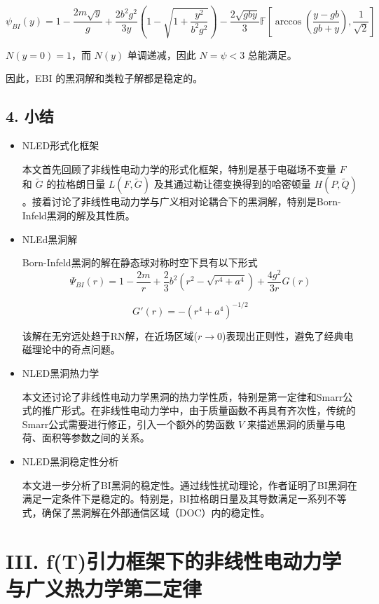 \documentclass[aps,prl,preprint,groupedaddress]{revtex4-2}
\begin{document}
$$
\psi_{BI}(y)
=1-\frac{2m\sqrt{y} }{g } + \frac{2b^2 g^2 }{3y } \left(1-\sqrt{1+\frac{y^2 }{b^2 g^2 } } \right) - \frac{2\sqrt{gby} }{3 } \mathbb{F}\left[\arccos\left(\frac{y-gb }{gb+y } \right), \frac{1 }{\sqrt{2} } \right]
$$

$N(y=0)=1$，而 $N(y)$ 单调递减，因此 $N=\psi<3$ 总能满足。

因此，EBI 的黑洞解和类粒子解都是稳定的。

\subsection{4. 小结}

\begin{itemize}
    \item NLED形式化框架

本文首先回顾了非线性电动力学的形式化框架，特别是基于电磁场不变量 $F$ 和 $\tilde{G}$ 的拉格朗日量 $L(F,\tilde{G})$ 及其通过勒让德变换得到的哈密顿量 $H(P,\tilde{Q})$。接着讨论了非线性电动力学与广义相对论耦合下的黑洞解，特别是Born-Infeld黑洞的解及其性质。
    \item NLEd黑洞解
    
    Born-Infeld黑洞的解在静态球对称时空下具有以下形式
$$
\Psi_{BI}(r)
=1-\frac{2m }{r } + \frac{2 }{3 } b^2\left(r^2-\sqrt{r^4+a^4} \right) + \frac{4g^2 }{3r } G(r)
$$

$$
G'(r)
=-\left(r^4+a^4 \right)^{-1/2}
$$

该解在无穷远处趋于RN解，在近场区域($r\to 0$)表现出正则性，避免了经典电磁理论中的奇点问题。
    \item NLED黑洞热力学

    本文还讨论了非线性电动力学黑洞的热力学性质，特别是第一定律和Smarr公式的推广形式。在非线性电动力学中，由于质量函数不再具有齐次性，传统的Smarr公式需要进行修正，引入一个额外的势函数 $V$ 来描述黑洞的质量与电荷、面积等参数之间的关系。

    \item NLED黑洞稳定性分析

    本文进一步分析了BI黑洞的稳定性。通过线性扰动理论，作者证明了BI黑洞在满足一定条件下是稳定的。特别是，BI拉格朗日量及其导数满足一系列不等式，确保了黑洞解在外部通信区域（DOC）内的稳定性。
\end{itemize}

\section{III. f(T)引力框架下的非线性电动力学与广义热力学第二定律}
\end{document}
